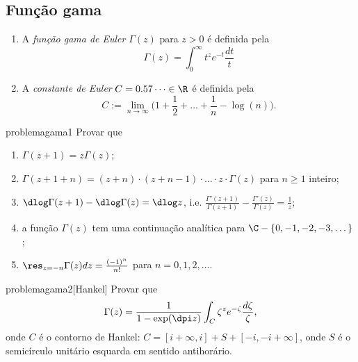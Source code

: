 \subsection{Função gama}

\begin{defin}
\begin{enumerate}
\item A \emph{função gama de Euler} $\Gamma(z)$ para $z>0$ é definida pela
\begin{equation}
\label{eq:gama}
\Gamma(z) = \int_0^\infty t^z e^{-t} \frac{dt}{t}
\end{equation}
\item A \emph{constante de Euler} $C=0.57\dots\in\R$ é definida pela
\begin{equation}
C := \lim_{n\to\infty} \big(1+\frac12+\dots+\frac{1}{n} - \log(n)\big).
\end{equation}
\end{enumerate}
\end{defin}

\begin{restatable}{problema}{gama1}\label{gama1}
Provar que
\begin{enumerate}
\item $\Gamma(z+1) = z \Gamma(z)$;
\item $\Gamma(z+1+n) = (z+n)\cdot(z+n-1)\cdot\dots\cdot z\cdot\Gamma(z)$ para $n\geq 1$ inteiro;
\item $\dlog \Gamma(z+1) - \dlog \Gamma(z) = \dlog z$,
i.e. $\frac{\Gamma'(z+1)}{\Gamma(z+1)} - \frac{\Gamma'(z)}{\Gamma(z)} = \frac{1}{z}$;
\item a função $\Gamma(z)$ tem uma continuação analítica para $\C-\{0,-1,-2,-3,\dots\}$;
\item $\res_{z=-n} \Gamma(z) dz = \frac{(-1)^n}{n!}$ para $n=0,1,2,\dots$.
\end{enumerate}
\end{restatable}

\begin{restatable}{problema}{gama2}[Hankel]\label{gama2}
Provar que
\begin{equation}
\Gamma(z) = \frac{1}{1-\exp(\dpi z)} \int_C \zeta^{z} e^{-\zeta} \frac{d\zeta}{\zeta},
\end{equation}
onde $C$ é o contorno de Hankel:
$C = [i+\infty,i] + S + [-i,-i+\infty]$, onde $S$ é o semicírculo unitário esquarda
em sentido antihorário.
\end{restatable}

